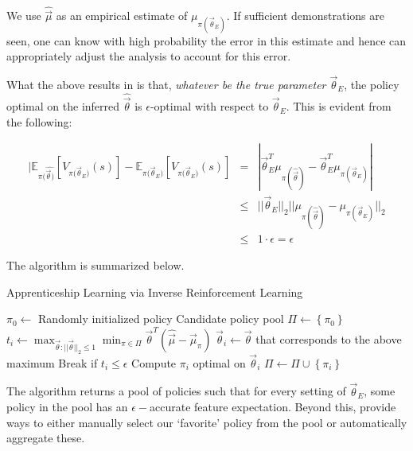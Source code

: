 We use $\hat{\vec{\mu}}$ as an empirical estimate of $\mu_{\pi(\vec{\theta}_E)}$. If sufficient demonstrations are seen, one can know with high probability the error in this estimate and hence can appropriately adjust the analysis to account for this error.

What the above results in is that, \textit{whatever be the true parameter $\vec{\theta}_E$}, the policy optimal on the inferred $\hat{\vec{\theta}}$ is $\epsilon$-optimal with respect to $\vec{\theta}_E$. This is evident from the following: 

\begin{equation}
\begin{array}{rcl}
|\mathbb{E}_{\pi(\hat{\vec{\theta})}}[V_{\pi({\vec{\theta}_E)}}(s)] - \mathbb{E}_{\pi({\vec{\theta}_E)}}[V_{\pi({\vec{\theta}_E)}}(s)] &=& | \vec{\theta}_E^T \mu_{\pi(\hat{\vec{\theta}})} - \vec{\theta}_E^T \mu_{\pi(\vec{\theta}_E)} |\\
&\leq& || \vec{\theta}_E ||_2 || \mu_{\pi(\hat{\vec{\theta}})}  - \mu_{\pi(\vec{\theta}_E)} ||_2\\
&\leq& 1 \cdot \epsilon = \epsilon
\end{array}
\end{equation}

The algorithm is summarized below. 

\begin{algorithm}[H]
\caption{Apprenticeship Learning via Inverse Reinforcement Learning}
\begin{algorithmic}
	\State $\pi_0 \gets $ Randomly initialized policy
	\State Candidate policy pool $\Pi \gets \left\lbrace \pi_0 \right\rbrace$ 
		\State $t_i \gets \max_{\vec{\theta}: || \vec{\theta}||_2 \leq 1} \min_{\pi \in \Pi} \vec{\theta}^T (\hat{\vec{\mu}} - \vec{\mu}_{\pi})$
		\State $\vec{\theta}_i \gets \vec{\theta} $ that corresponds to the above maximum 
		\State Break if $t_i \leq \epsilon$
		\State Compute $\pi_{i}$ optimal on ${\vec{\theta}_{i}}$ 
		\State $\Pi \gets \Pi \cup \left\lbrace \pi_i \right\rbrace$ 
    \EndFor
\end{algorithmic}
\end{algorithm}

The algorithm returns a pool of policies such that for every setting of $\vec{\theta}_E$, some policy in the pool has an $\epsilon-$accurate feature expectation. Beyond this, \citet{Abbeel:2004:ALV:1015330.1015430} provide ways to either manually select our `favorite' policy from the pool or automatically aggregate these. 


